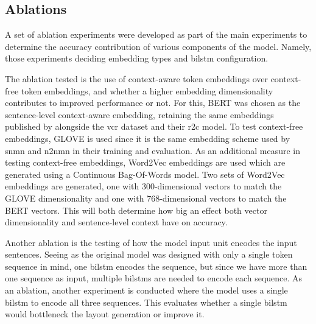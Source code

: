 \subsection{Ablations}
\label{subsec:experiment-ablations}

A set of ablation experiments were developed as part of the main experiments to determine the accuracy contribution of various components of the model.
Namely, those experiments deciding embedding types and \gls{bilstm} configuration.

The ablation tested is the use of context-aware token embeddings over context-free token embeddings, and whether a higher embedding dimensionality contributes to improved performance or not.
For this, BERT was chosen as the sentence-level context-aware embedding, retaining the same embeddings published by \citeauthor{zellers_recognition_2019} alongside the \gls{vcr} dataset and their \gls{r2c} model\cite{zellers_recognition_2019}.
To test context-free embeddings, GLOVE is used since it is the same embedding scheme used by \gls{snmn} and \gls{n2nmn} in their training and evaluation.
As an additional measure in testing context-free embeddings, Word2Vec embeddings are used which are generated using a Continuous Bag-Of-Words model\cite{mikolov_we_2013}.
Two sets of Word2Vec embeddings are generated, one with 300-dimensional vectors to match the GLOVE dimensionality and one with 768-dimensional vectors to match the BERT vectors.
This will both determine how big an effect both vector dimensionality and sentence-level context have on accuracy.

Another ablation is the testing of how the model input unit encodes the input sentences.
Seeing as the original model was designed with only a single token sequence in mind, one \gls{bilstm} encodes the sequence, but since we have more than one sequence as input, multiple \glspl{bilstm} are needed to encode each sequence.
As an ablation, another experiment is conducted where the model uses a single \gls{bilstm} to encode all three sequences.
This evaluates whether a single \gls{bilstm} would bottleneck the layout generation or improve it.
